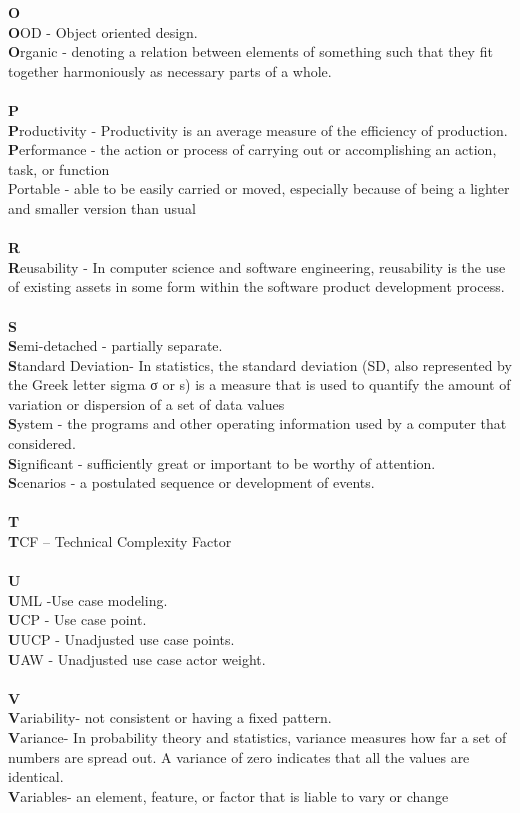 \documentclass[a4paper, 11pt]{article}
\begin{document}
\textbf{O}\\
\textbf{O}OD - Object oriented design.\\
\textbf{O}rganic - denoting a relation between elements of something such that they fit together harmoniously as necessary parts of a whole.\\ \\
\textbf{P}\\
\textbf{P}roductivity - Productivity is an average measure of the efficiency of production.\\
\textbf{P}erformance - the action or process of carrying out or accomplishing an action, task, or function\\
Portable - able to be easily carried or moved, especially because of being a lighter and smaller version than usual\\ \\
\textbf{R}\\
\textbf{R}eusability - In computer science and software engineering, reusability is the use of existing assets in some form within the software product development process.\\ \\
\textbf{S}\\
\textbf{S}emi-detached - partially separate.\\
\textbf{S}tandard Deviation- In statistics, the standard deviation (SD, also represented by the Greek letter sigma σ or s) is a measure that is used to quantify the amount of variation or dispersion of a set of data values\\
\textbf{S}ystem - the programs and other operating information used by a computer that considered.\\
\textbf{S}ignificant - sufficiently great or important to be worthy of attention.\\
\textbf{S}cenarios - a postulated sequence or development of events. \\ \\
\textbf{T}\\
\textbf{T}CF – Technical Complexity Factor\\ \\
\textbf{U}\\
\textbf{U}ML  -Use case modeling.\\
\textbf{U}CP - Use case point.\\
\textbf{U}UCP - Unadjusted use case points.\\
\textbf{U}AW - Unadjusted use case actor weight.\\ \\
\textbf{V}\\
\textbf{V}ariability- not consistent or having a fixed pattern.\\
\textbf{V}ariance- In probability theory and statistics, variance measures how far a set of numbers are spread out. A variance of zero indicates that all the values are identical.\\
\textbf{V}ariables- an element, feature, or factor that is liable to vary or change\\ \\
\end{document}
